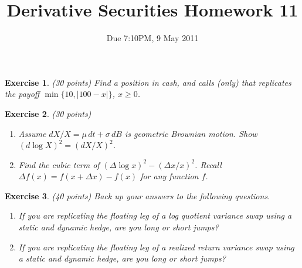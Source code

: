 \documentclass[11pt,fleqn]{amsproc}
\newtheorem{xca}{Exercise}
\begin{document}
\title{Derivative Securities Homework 11}
\author{Due 7:10PM, 9 May 2011}

\maketitle

\begin{xca}{(30 points)}
Find a position in cash, and calls (only) that
replicates the payoff $\min\{10, |100 - x|\}$, $x\ge0$.
\end{xca}

\begin{xca}{(30 points)}
\begin{enumerate}
\item
Assume $dX/X = \mu\,dt + \sigma\,dB$ is geometric Brownian motion.
Show $(d\log X)^2 = (dX/X)^2$.
\item Find the cubic term of $(\Delta\log x)^2 - (\Delta x/x)^2$.
Recall $\Delta f(x) = f(x + \Delta x) - f(x)$ for any function $f$.
\end{enumerate}
\end{xca}

\begin{xca}{(40 points)}
Back up your answers to the following questions.
\begin{enumerate}
\item If you are replicating the floating leg of a log quotient
variance swap using a static and dynamic hedge, are you long
or short jumps?
\item If you are replicating the floating leg of a realized return
variance swap using a static and dynamic hedge, are you long
or short jumps?
\end{enumerate}
\end{xca}
\end{document}
